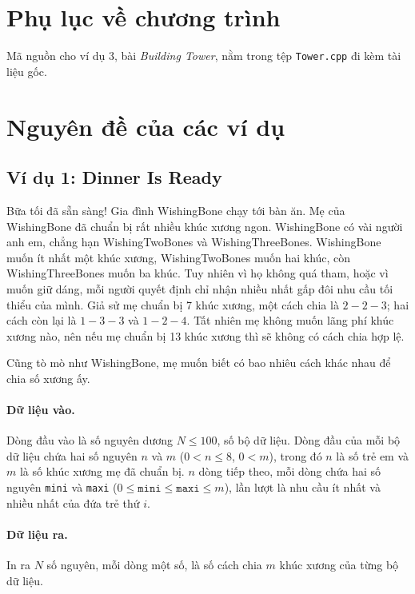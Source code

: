 \documentclass[11pt]{article}
\begin{document}
\section*{Phụ lục về chương trình}

Mã nguồn cho ví dụ 3, bài \textit{Building Tower}, nằm trong tệp
\texttt{Tower.cpp} đi kèm tài liệu gốc.

\appendix
\section{Nguyên đề của các ví dụ}

\subsection{Ví dụ 1: Dinner Is Ready}

Bữa tối đã sẵn sàng! Gia đình WishingBone chạy tới bàn ăn. Mẹ của WishingBone
đã chuẩn bị rất nhiều khúc xương ngon. WishingBone có vài người anh em, chẳng
hạn WishingTwoBones và WishingThreeBones. WishingBone muốn ít nhất một khúc
xương, WishingTwoBones muốn hai khúc, còn WishingThreeBones muốn ba khúc. Tuy
nhiên vì họ không quá tham, hoặc vì muốn giữ dáng, mỗi người quyết định chỉ
nhận nhiều nhất gấp đôi nhu cầu tối thiểu của mình. Giả sử mẹ chuẩn bị 7 khúc
xương, một cách chia là \(2-2-3\); hai cách còn lại là \(1-3-3\) và \(1-2-4\).
Tất nhiên mẹ không muốn lãng phí khúc xương nào, nên nếu mẹ chuẩn bị 13 khúc
xương thì sẽ không có cách chia hợp lệ.

Cũng tò mò như WishingBone, mẹ muốn biết có bao nhiêu cách khác nhau để chia số
xương ấy.

\paragraph{Dữ liệu vào.}
Dòng đầu vào là số nguyên dương \(N\le 100\), số bộ dữ liệu. Dòng đầu của mỗi
bộ dữ liệu chứa hai số nguyên \(n\) và \(m\) (\(0<n\le 8\), \(0<m\)), trong đó
\(n\) là số trẻ em và \(m\) là số khúc xương mẹ đã chuẩn bị. \(n\) dòng tiếp
theo, mỗi dòng chứa hai số nguyên \texttt{mini} và \texttt{maxi}
(\(0\le\texttt{mini}\le\texttt{maxi}\le m\)), lần lượt là nhu cầu ít nhất và
nhiều nhất của đứa trẻ thứ \(i\).

\paragraph{Dữ liệu ra.}
In ra \(N\) số nguyên, mỗi dòng một số, là số cách chia \(m\) khúc xương của
từng bộ dữ liệu.
\end{document}
